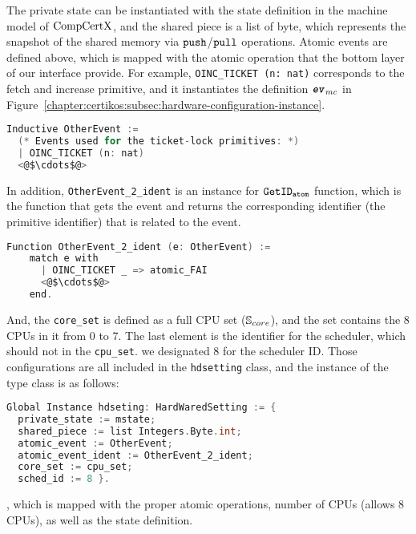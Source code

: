 The private state can be instantiated with 
the state definition in the machine model of $\mathrm{CompCertX}$,
and the shared piece is a list of byte, which represents 
the snapshot of the shared memory via ${\mathrm{\texttt{push}}}$/${\mathrm{\texttt{pull}}}$ operations. 
Atomic events are defined above, 
which is mapped with the atomic operation that the bottom layer of our interface provide.
For example, \lstinline$OINC_TICKET (n: nat)$ corresponds to the fetch and increase primitive,
and it instantiates the definition ${{\mathrm{\texttt{\textbf{\textit{ev}}}}}_{mc}}$ in Figure~\ref{chapter:certikos:subsec:hardware-configuration-instance}.
\begin{lstlisting}[language=C]
  Inductive OtherEvent :=
  (* Events used for the ticket-lock primitives: *)
  | OINC_TICKET (n: nat)
  <@$\cdots$@>
\end{lstlisting}
In addition, \lstinline$OtherEvent_2_ident$ is an instance for ${{\mathrm{\texttt{GetID}}}_{{\mathrm{\texttt{atom}}}}}$ function, which is the function
that gets the event and returns the corresponding identifier (the primitive identifier) that is related to the event.
\begin{lstlisting}[language=C]
  Function OtherEvent_2_ident (e: OtherEvent) :=
    match e with
      | OINC_TICKET _ => atomic_FAI
      <@$\cdots$@>
    end.
\end{lstlisting}
And, the \lstinline$core_set$ is defined as a full CPU set (${\mathbb{S}_{core}}$), and 
the set contains the 8 CPUs in it from 0 to 7.
The last element is the identifier for 
the scheduler, which should not in the \lstinline$cpu_set$. 
we designated 8 for the scheduler ID.
Those configurations are all included in the 
\lstinline$hdsetting$ class, and the instance of the type class
is as follows:
\begin{lstlisting}[language=C, deletekeywords={int}]
Global Instance hdseting: HardWaredSetting := {
  private_state := mstate;
  shared_piece := list Integers.Byte.int;
  atomic_event := OtherEvent;
  atomic_event_ident := OtherEvent_2_ident;
  core_set := cpu_set;
  sched_id := 8 }.
\end{lstlisting}
, which is mapped with 
the proper atomic operations, number of CPUs (allows 8 CPUs), 
as well as the state definition. 


